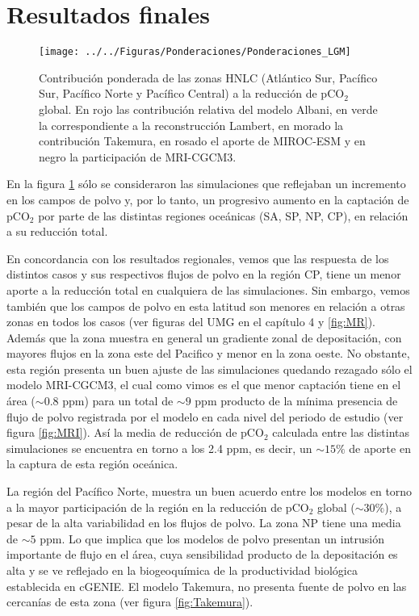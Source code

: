\section{Resultados finales}

\begin{figure}[H]
\centering
 \texttt{[image: ../../Figuras/Ponderaciones/Ponderaciones\_LGM]}
 \caption[Contribución ponderada de las zonas HNLC a la reducción de CO$_2$ global]{Contribución ponderada de las zonas HNLC (Atlántico Sur, Pacífico Sur, Pacífico Norte y Pacífico Central) a la reducción de pCO$_2$ global. En rojo las contribución relativa del modelo Albani, en verde la correspondiente a la reconstrucción Lambert, en morado la contribución Takemura, en rosado el aporte de MIROC-ESM y en negro la participación de MRI-CGCM3.   }
  \label{fig:Ponderacion}
\end{figure}

En la figura \ref{fig:Ponderacion} sólo se consideraron las simulaciones que reflejaban un incremento en los campos de polvo y, por lo tanto, un progresivo aumento en la captación de pCO$_2$ por parte de las distintas regiones oceánicas (SA, SP, NP, CP), en relación a su reducción total. 

En concordancia con los resultados regionales, vemos que las respuesta de los distintos casos y sus respectivos flujos de polvo en la región CP, tiene un menor aporte a la reducción total en cualquiera de las simulaciones. Sin embargo, vemos también que los campos de polvo en esta latitud son menores en relación a otras zonas en todos los casos (ver figuras del UMG en el capítulo 4 y \ref{fig:MR}). Además que la zona muestra en general un gradiente zonal de depositación, con mayores flujos en la zona este del Pacifico y menor en la zona oeste. No obstante, esta región presenta un buen ajuste de las simulaciones quedando rezagado sólo el modelo MRI-CGCM3, el cual como vimos es el que menor captación tiene en el área ($\sim 0.8$ ppm) para un total de $\sim 9$ ppm producto de la mínima presencia de flujo de polvo registrada por el modelo en cada nivel del periodo de estudio (ver figura \ref{fig:MRI}). Así la media de reducción de pCO$_2$ calculada entre las distintas simulaciones se encuentra en torno a los 2.4 ppm, es decir, un $\sim 15\%$ de aporte en la captura de esta región oceánica. 


La región del Pacífico Norte, muestra un buen acuerdo entre los modelos en torno a la mayor participación de la región en la reducción de pCO$_2$ global ($\sim 30\% $), a pesar de la alta variabilidad en los flujos de polvo. La zona NP tiene una media de $\sim 5$ ppm. Lo que implica que los modelos de polvo presentan un intrusión importante de flujo en el área, cuya sensibilidad producto de la depositación es alta y se ve reflejado en la biogeoquímica de la productividad biológica establecida en cGENIE. El modelo Takemura, no presenta fuente de polvo en las cercanías de esta zona (ver figura \ref{fig:Takemura}). 

